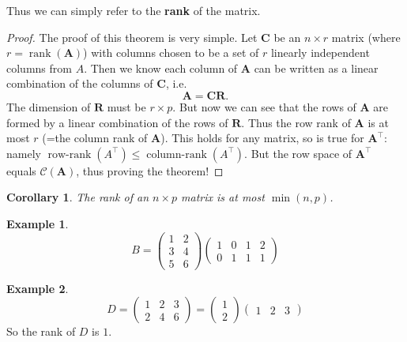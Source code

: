 \documentclass[
]{book}
\newtheorem{corollary}{Corollary}[chapter]
\theoremstyle{definition}
\theoremstyle{definition}
\newtheorem{example}{Example}[chapter]
\theoremstyle{definition}
\theoremstyle{definition}
\theoremstyle{remark}
\begin{document}
Thus we can simply refer to the \textbf{rank} of the matrix.

\begin{proof}
The proof of this theorem is very simple. Let \(\mathbf C\) be an \(n \times r\) matrix (where \(r=\operatorname{rank}(\mathbf A)\)) with columns chosen to be a set of \(r\) linearly independent columns from \(A\). Then we know each column of \(\mathbf A\) can be written as a linear combination of the columns of \(\mathbf C\), i.e.
\[\mathbf A= \mathbf C\mathbf R.\]
The dimension of \(\mathbf R\) must be \(r \times p\). But now we can see that the rows of \(\mathbf A\) are formed by a linear combination of the rows of \(\mathbf R\). Thus the row rank of \(\mathbf A\) is at most \(r\) (=the column rank of \(\mathbf A\)). This holds for any matrix, so is true for \(\mathbf A^\top\): namely \(\operatorname{row-rank}(A^\top)\leq \operatorname{column-rank}(A^\top)\). But the row space of \(\mathbf A^\top\) equals \(\mathcal{C}(\mathbf A)\), thus proving the theorem!
\end{proof}

\begin{corollary}
\protect\hypertarget{cor:unnamed-chunk-1}{}{\label{cor:unnamed-chunk-1} }The rank of an \(n\times p\) matrix is at most \(\min(n,p)\).
\end{corollary}

\begin{example}
\protect\hypertarget{exm:matrix1}{}{\label{exm:matrix1} }\[B = \left( \begin{array}{cccc} 1 & 2\\ 3&4 \\5&6\end{array}\right)\left(\begin{array}{cccc}1&0&1&2\\0&1&1&1\end{array}\right)
\]
\end{example}

\begin{example}
\protect\hypertarget{exm:matrix2}{}{\label{exm:matrix2} }\[ D=\left( \begin{array}{ccc} 1 & 2&3\\ 2&4&6 \end{array}\right)= \left( \begin{array}{c} 1 \\ 2 \end{array}\right)\left(\begin{array}{ccc}1&2&3\end{array}\right)
\]
So the rank of \(D\) is \(1\).
\end{example}
\end{document}
